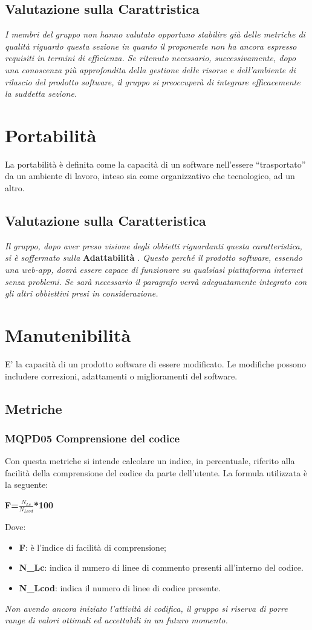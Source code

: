 \subsection{Valutazione sulla Carattristica} \label{3.4.1}
\textit{I membri del gruppo non hanno valutato opportuno stabilire già delle metriche di qualità riguardo questa sezione in quanto il proponente non ha ancora espresso requisiti in termini di efficienza. Se ritenuto necessario, successivamente, dopo una conoscenza più approfondita della gestione delle risorse e dell’ambiente di rilascio del prodotto software, il gruppo si preoccuperà di integrare efficacemente la suddetta sezione.}

\section{Portabilità} \label{3.5}
La portabilità è definita come la capacità di un software nell’essere “trasportato” da un ambiente di lavoro, inteso sia come organizzativo che tecnologico,  ad un altro.

\subsection{Valutazione sulla Caratteristica} \label{3.5.2}
\textit{Il gruppo, dopo aver preso visione degli obbietti riguardanti questa caratteristica, si è soffermato sulla }\textbf{Adattabilità} \textit{.
Questo perché il prodotto software, essendo una web-app, dovrà essere capace di funzionare su qualsiasi piattaforma internet senza problemi.
Se sarà necessario il paragrafo verrà adeguatamente integrato con gli altri obbiettivi presi in considerazione.}

\section{Manutenibilità} \label{3.6}
E' la capacità di un prodotto software di essere modificato. Le modifiche possono includere correzioni, adattamenti o miglioramenti del software.
\subsection{Metriche} \label{3.6.1}
\subsubsection{MQPD05 Comprensione del codice}
Con questa metriche si intende calcolare un indice, in percentuale, riferito alla facilità della comprensione del codice da parte dell'utente.
La formula utilizzata è la seguente:
\begin{center}
	\textbf{F=$\frac{N_{Lc}}{N_{Lcod}}$*100}
\end{center}
Dove:
\begin{itemize}
	\item \textbf{F}: è l'indice di facilità di comprensione;
	\item \textbf{N\_{Lc}}: indica il numero di linee di commento presenti all'interno del codice.
	\item \textbf{N\_{Lcod}}: indica il numero di linee di codice presente.
\end{itemize}

\textit{Non avendo ancora iniziato l'attività di codifica, il gruppo si riserva di porre range di valori ottimali ed accettabili in un futuro momento.}